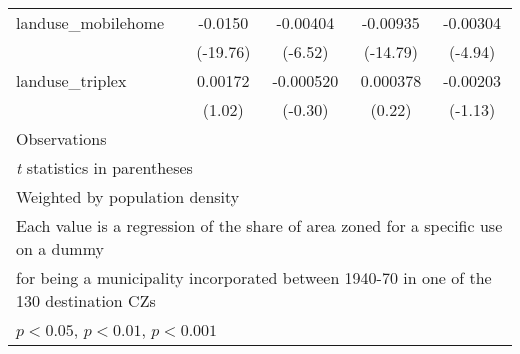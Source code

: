 \begin{table}[htbp]
\begin{tabular}{l*{4}{c}}
\addlinespace
landuse\_mobilehome  &     -0.0150\sym{***}&    -0.00404\sym{***}&    -0.00935\sym{***}&    -0.00304\sym{***}\\
                    &    (-19.76)         &     (-6.52)         &    (-14.79)         &     (-4.94)         \\
\addlinespace
landuse\_triplex     &     0.00172         &   -0.000520         &    0.000378         &    -0.00203         \\
                    &      (1.02)         &     (-0.30)         &      (0.22)         &     (-1.13)         \\
\midrule
Observations        &                     &                     &                     &                     \\
\bottomrule
\multicolumn{5}{l}{\footnotesize \textit{t} statistics in parentheses}\\
\multicolumn{5}{l}{\footnotesize Weighted by population density}\\
\multicolumn{5}{l}{\footnotesize Each value is a regression of the share of area zoned for a specific use on a dummy}\\
\multicolumn{5}{l}{\footnotesize for being a municipality incorporated between 1940-70 in one of the 130 destination CZs}\\
\multicolumn{5}{l}{\footnotesize \sym{*} \(p<0.05\), \sym{**} \(p<0.01\), \sym{***} \(p<0.001\)}\\
\end{tabular}
\end{table}
